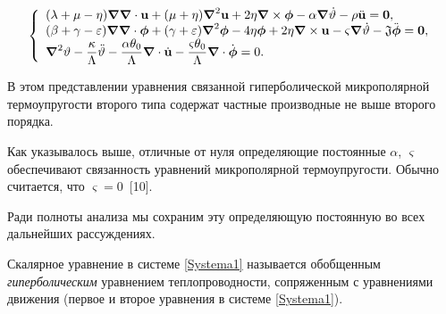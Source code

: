 \begin{equation}

\label{Systema1}

\left\{

\begin{array}{l}

{(\lambda + \mu - \eta ){\boldsymbol\nabla}{\boldsymbol\nabla} \cdot {\bf u} + (\mu+ \eta){\boldsymbol\nabla}^2 {\bf u} + 2\eta {\boldsymbol\nabla} \times  {\boldsymbol\phi} - \alpha {\boldsymbol\nabla} \dot{\vartheta} - \rho \ddot{{\bf u}}={\bf 0}},\\

{(\beta + \gamma - \varepsilon ){\boldsymbol\nabla} {\boldsymbol\nabla} \cdot {\boldsymbol\phi} + (\gamma+ \varepsilon){\boldsymbol\nabla}^2 {\boldsymbol\phi}-4\eta{\boldsymbol\phi} + 2\eta {\boldsymbol\nabla} \times  {\bf u} - \varsigma {\boldsymbol\nabla}\dot{\vartheta} - {\mathfrak J} \ddot{{\boldsymbol\phi}}={\bf 0}},\\

{\boldsymbol\nabla}^2 \vartheta - \dfrac{\kappa}{\Lambda} \ddot{\vartheta} - \dfrac{\alpha\theta_0}{\Lambda}{\boldsymbol\nabla} \cdot \dot{{\bf u}} - \dfrac{\varsigma\theta_0}{\Lambda}{\boldsymbol\nabla} \cdot \dot{{\boldsymbol\phi}}=0.\\

\end{array}

\right.

\end{equation}

В этом представлении уравнения связанной гиперболической микрополярной термоупругости второго типа содержат частные производные не выше второго порядка.



Как указывалось выше, отличные от нуля определяющие постоянные $\alpha$, $\varsigma$ обеспечивают связанность уравнений микрополярной термоупругости. Обычно считается, что $\varsigma=0$~[10].

Ради полноты анализа мы сохраним эту определяющую постоянную во всех дальнейших рассуждениях.



Скалярное уравнение в системе \eqref{Systema1} называется обобщенным {\sl гиперболическим} уравнением теплопроводности, сопряженным с уравнениями движения (первое и второе уравнения в системе \eqref{Systema1}).



\smallskip



